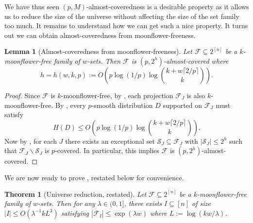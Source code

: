 \documentclass{article}
\newtheorem{theorem}{Theorem}[section]
\newtheorem{lemma}[lemma]{Lemma}
\newcommand{\<}{\langle}
\renewcommand{\>}{\rangle}
\newcommand{\calF}{\mathcal{F}}
\newcommand{\calS}{\mathcal{S}}
\begin{document}
We have thus seen $(p, M)$-almost-coveredness is a desirable property as it allows us to reduce the size of the universe without affecting the size of the set family too much. It remains to understand how we can get such a nice property. It turns out we can obtain almost-coveredness from moonflower-freeness.
\begin{lemma}[Almost-coveredness from moonflower-freeness]\label{lem:WSF_free_sets_are_good} Let $\calF \subseteq 2^{[n]}$ be a $k$-moonflower-free family of $w$-sets. Then $\calF$ is $(p, 2^h)$-almost-covered where 
\[
h = h(w,k,p):=O\left(p \log(1/p) \log \binom{k+w \lceil 2/p \rceil}{k} \right).
\]
\end{lemma}


\begin{proof}
    Since $\calF$ is $k$-moonflower-free, by , each projection $\calF_J$ is also $k$-moonflower-free. By , every $p$-smooth distribution $D$ supported on $\calF_J$ must satisfy
    \[
     H(D) \leq O \left( p \log(1/p)  \log \binom{k+w \lceil 2/p \rceil}{k} \right).
    \]
  Now by  , for each $J$ there exists an exceptional set $\calS_J \subseteq \calF_J$ with $|\calS_J| \leq 2^h$ such that $\calF_J \backslash \calS_J$ is $p$-covered. In particular, this implies $\calF$ is $(p, 2^h)$-almost-covered.
    
\end{proof}

We are now ready to prove , restated below for convenience.

\begin{theorem}[Universe reduction,  restated]
    Let $\calF \subseteq 2^{[n]}$ be a $k$-moonflower-free family of $w$-sets. Then for any $\lambda \in (0, 1]$, there exists $I \subseteq [n]$ of size $|I| \leq O( \lambda^{-1}k L^3)$ satisfying $|\calF_{\bar{I}}| \leq \exp (\lambda w)$ where $L:= \log(kw / \lambda)$. 
\end{theorem}
\end{document}
